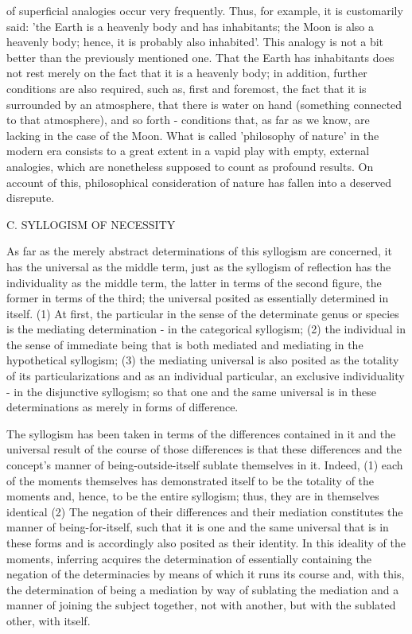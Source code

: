 of superficial analogies occur very frequently. Thus, for example, it is customarily
said: 'the Earth is a heavenly body and has inhabitants; the Moon is also a heavenly
body; hence, it is probably also inhabited'. This analogy is not a bit better than the
previously mentioned one. That the Earth has inhabitants does not rest merely on
the fact that it is a heavenly body; in addition, further conditions are also required,
such as, first and foremost, the fact that it is surrounded by an atmosphere, that
there is water on hand (something connected to that atmosphere), and so forth -
conditions that, as far as we know, are lacking in the case of the Moon. What is
called 'philosophy of nature' in the modern era consists to a great extent in a vapid
play with empty, external analogies, which are nonetheless supposed to count as
profound results. On account of this, philosophical consideration of nature has
fallen into a deserved disrepute.

C. SYLLOGISM OF NECESSITY

As far as the merely abstract determinations of this syllogism are concerned,
it has the universal as the middle term, just as the syllogism of reflection
has the individuality as the middle term,
the latter in terms of the second figure, the former in terms of the third;
the universal posited as essentially determined in itself.
(1) At first, the particular in the sense of the determinate genus or species is
the mediating determination - in the categorical syllogism;
(2) the individual in the sense of immediate being that is
both mediated and mediating in the hypothetical syllogism;
(3) the mediating universal is also posited as the totality of
its particularizations and as an individual particular,
 an exclusive individuality - in the disjunctive syllogism;
so that one and the same universal is in these determinations as
merely in forms of difference.

The syllogism has been taken in terms of the differences contained in it and
the universal result of the course of those differences is that
these differences and the concept's manner of being-outside-itself
sublate themselves in it.
Indeed, (1) each of the moments themselves has demonstrated itself to be
the totality of the moments and, hence, to be the entire syllogism;
thus, they are in themselves identical
(2) The negation of their differences and their mediation constitutes the
manner of being-for-itself, such that it is one and the same universal
that is in these forms and is accordingly also posited as their identity.
In this ideality of the moments, inferring acquires the determination
of essentially containing the negation of the determinacies by means of
which it runs its course and, with this, the determination of being a
mediation by way of sublating the mediation and a manner of joining
the subject together, not with another, but with the sublated other,
with itself.

